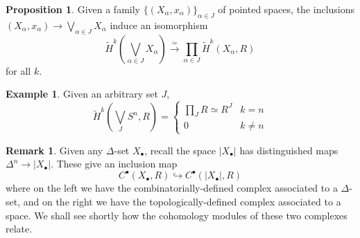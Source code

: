\documentclass{tufte-handout}
\def\into {\hookrightarrow}
\theoremstyle{definition}
\newtheorem{prop}{Proposition}
\newtheorem{example}{Example}
\newtheorem*{rem}{Remark}
\begin{document}
\begin{prop}
Given a family $\{(X_\alpha,x_\alpha)\}_{\alpha\in J}$ of pointed spaces, the inclusions $(X_\alpha,x_\alpha) \to \bigvee_{\alpha\in J} X_\alpha$ induce an isomorphism
\[
	\widetilde{H}^k(\bigvee_{\alpha\in J} X_\alpha) \xrightarrow{\simeq} \prod_{\alpha \in J} \widetilde{H}^k(X_\alpha,R)
\]
for all $k$.
\end{prop}

\begin{example}
Given an arbitrary set $J$,
\[
	\widetilde{H}^k(\bigvee_J S^n,R) = \begin{cases}
	\prod_J R \simeq R^J & k=n\\
	0 & k\neq n
	\end{cases}
\]
\end{example}

\begin{rem}
Given any $\Delta$-set $X_\bullet$, recall the space $|X_\bullet|$ has distinguished maps $\Delta^n \to |X_\bullet|$. These give an inclusion map
\[
	C^\bullet(X_\bullet,R) \into C^\bullet(|X_\bullet|,R)
\]
where on the left we have the combinatorially-defined complex associated to a $\Delta$-set, and on the right we have the topologically-defined complex associated to a space. We shall see shortly how the cohomology modules of these two complexes relate.
\end{rem}
\end{document}
